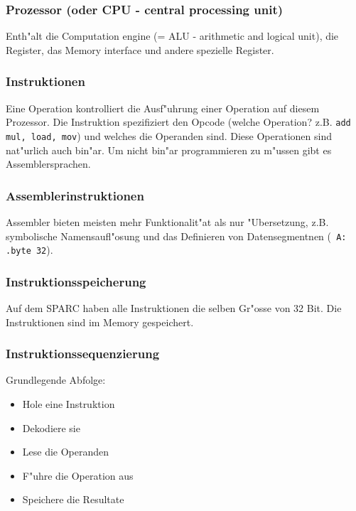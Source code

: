 \documentclass[german, 10pt, a4paper, twocolumn]{scrartcl}
\begin{document}
\subsubsection{Prozessor (oder CPU - central processing unit)}

Enth"alt die Computation engine (= ALU - arithmetic and logical unit), die Register, das Memory interface und andere spezielle Register.

\subsubsection{Instruktionen}

Eine Operation kontrolliert die Ausf"uhrung einer Operation auf diesem Prozessor. Die Instruktion spezifiziert den Opcode (welche Operation? z.B. \verb#add mul, load, mov#) und welches die Operanden sind. Diese Operationen sind nat"urlich auch bin"ar. Um nicht bin"ar programmieren zu m"ussen gibt es Assemblersprachen.

\subsubsection{Assemblerinstruktionen}

Assembler bieten meisten mehr Funktionalit"at als nur "Ubersetzung, z.B. symbolische Namensaufl"osung und das Definieren von Datensegmentnen (\verb# A: .byte 32#).

\subsubsection{Instruktionsspeicherung}

Auf dem SPARC haben alle Instruktionen die selben Gr"osse von 32 Bit. Die Instruktionen sind im Memory gespeichert.

\subsubsection{Instruktionssequenzierung}

Grundlegende Abfolge:
\begin{itemize}
	\item Hole eine Instruktion
	\item Dekodiere sie
	\item Lese die Operanden
	\item F"uhre die Operation aus
	\item Speichere die Resultate
\end{itemize}
\end{document}

